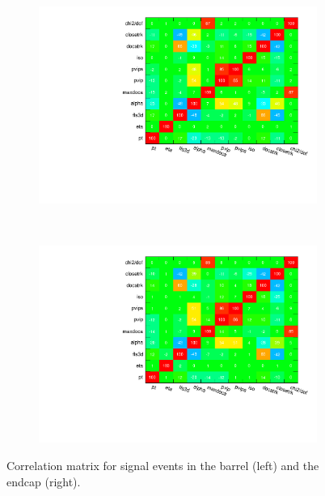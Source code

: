 \documentclass[10pt,a4paper]{article}
\begin{document}
\begin{figure}
		\centering
        \begin{subfigure}[b]{0.45\textwidth}
				\includegraphics[width=\textwidth]{Figures/correlationMatrixS_barrel}
				\label{fig:matrixSBarrel}
        \end{subfigure}
        ~
        \begin{subfigure}[b]{0.45\textwidth}
				\includegraphics[width=\textwidth]{Figures/correlationMatrixS_endcaps}
				\label{fig:matrixSEndcaps}
        \end{subfigure}
        \caption{Correlation matrix for signal events in the barrel (left) and the endcap (right).}
        \label{fig:correlationMatricesSignal}
\end{figure}
\end{document}

